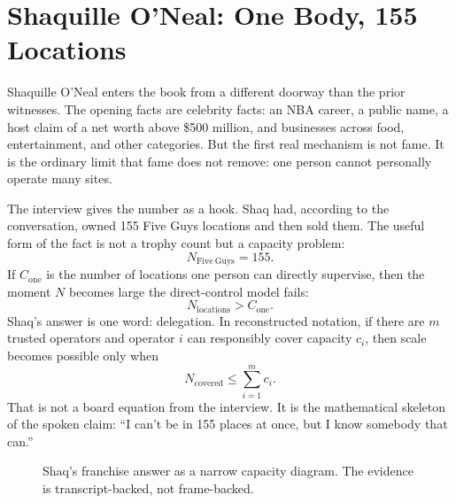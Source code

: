 \documentclass[11pt,oneside]{book}
\begin{document}
\section{Shaquille O'Neal: One Body, 155 Locations}

Shaquille O'Neal enters the book from a different doorway than the prior witnesses. The opening facts are celebrity facts: an NBA career, a public name, a host claim of a net worth above \$500 million, and businesses across food, entertainment, and other categories. But the first real mechanism is not fame. It is the ordinary limit that fame does not remove: one person cannot personally operate many sites.

The interview gives the number as a hook. Shaq had, according to the conversation, owned 155 Five Guys locations and then sold them. The useful form of the fact is not a trophy count but a capacity problem:
\begin{equation}
N_{\mathrm{Five\ Guys}}=155.
\end{equation}
If \(C_{\mathrm{one}}\) is the number of locations one person can directly supervise, then the moment \(N\) becomes large the direct-control model fails:
\begin{equation}
N_{\mathrm{locations}}>C_{\mathrm{one}}.
\end{equation}
Shaq's answer is one word: delegation. In reconstructed notation, if there are \(m\) trusted operators and operator \(i\) can responsibly cover capacity \(c_i\), then scale becomes possible only when
\begin{equation}
N_{\mathrm{covered}}\leq \sum_{i=1}^{m}c_i.
\end{equation}
That is not a board equation from the interview. It is the mathematical skeleton of the spoken claim: ``I can't be in 155 places at once, but I know somebody that can.''

\begin{figure}
\centering
{}
\caption{Shaq's franchise answer as a narrow capacity diagram. The evidence is transcript-backed, not frame-backed.}
\end{figure}
\end{document}
